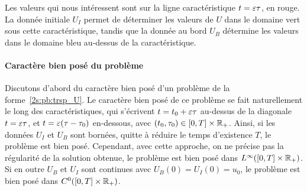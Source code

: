 \usetikzlibrary{decorations.markings}
\begin{center}
\end{center}

\noindent
Les valeurs qui nous intéressent sont sur la ligne caractéristique $t = \varepsilon\tau$, en rouge. La donnée initiale $U_I$ permet de déterminer les valeurs de $U$ dans le domaine vert sous cette caractéristique, tandis que la donnée au bord $U_B$ détermine les valeurs dans le domaine bleu au-dessus de la caractéristique. 


\paragraph{Caractère bien posé du problème \\}
Discutons d'abord du caractère bien posé d'un problème de la forme~\eqref{2s:pb:trsp_U}. Le caractère bien posé de ce problème se fait naturellement le long des caractéristiques, qui s'écrivent $t = t_0 + \varepsilon\tau$ au-dessus de la diagonale $t = \varepsilon\tau$, et $t = \varepsilon(\tau - \tau_0)$ en-dessous, avec $(t_0,\tau_0) \in [0,T] \times \mathbb{R}_+$. Ainsi, si les données $U_I$ et $U_B$ sont bornées, quitte à réduire le temps d'existence $T$, le problème est bien posé. Cependant, avec cette approche, on ne précise pas la régularité de la solution obtenue, le problème est bien posé dans $L^{\infty}([0,T] \times \mathbb{R}_+)$. Si en outre $U_B$ et $U_I$ sont continues avec $U_B(0) = U_I(0) = u_0$, le problème est bien posé dans $C^0([0,T] \times \mathbb{R}_+)$. 

